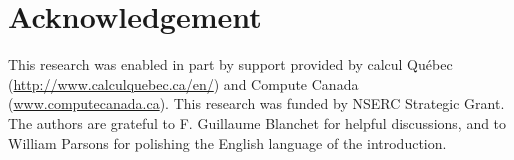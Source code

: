 \section{Acknowledgement}
This research was enabled in part by support provided by calcul Qu\'ebec (\url{http://www.calculquebec.ca/en/}) and Compute Canada (\url{www.computecanada.ca}). This research was funded by NSERC Strategic Grant. The authors are grateful to F. Guillaume Blanchet for helpful discussions, and to William Parsons for polishing the English language of the introduction.
